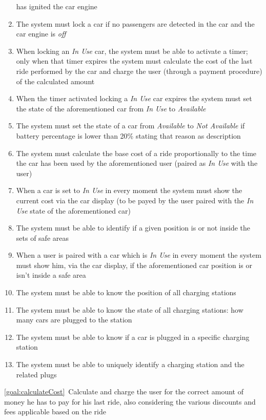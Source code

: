 \begin{description}
\begin{enumerate}[resume*]
  				has ignited the car engine
  				\item The system must lock a car if no passengers are detected in the car and the car
  				engine is \emph{off}
  				\item When locking  an \emph{In Use} car, the system must be able to activate a
  				timer; only when that timer expires the system must calculate the cost of the last ride
  				performed by the car and charge the user (through a payment procedure) of the
  				calculated amount
  				\item When the timer activated locking a \emph{In Use} car expires the system must
  				set the state of the aforementioned car from \emph{In Use} to \emph{Available}
  				\item The system must set the state of a car from \emph{Available}
  				to \emph{Not Available} if battery percentage is lower than 20\%  stating that reason
  				as description
  				\item The system must calculate the base cost of a ride proportionally to the time
  				the car has been used by the aforementioned user (paired as \emph{In Use} with the
  				user)
  				\item When a car is set to \emph{In Use} in every moment the system must show the
  				current cost via the car display (to be payed by the user paired with the \emph{In Use}
  				state of the aforementioned car) 
  				\item The system must be able to identify if a given position is or not inside the sets
  				of safe areas
  				\item When a user is paired with a car which is \emph{In Use} in every moment the
  				system must show him, via the car display, if the aforementioned car position is or
  				isn't inside a safe area
  				\item The system must be able to know the position of all charging stations
  				\item The system must be able to know the state of all charging stations: how many
  				cars are plugged to the station
  				\item The system must be able to know if a car is plugged in a specific charging
  				station
  				\item The system must be able to uniquely identify a charging station and the related
  				plugs
   			\end{enumerate}
  		\item \ref{goal:calculateCost}\ Calculate and charge the user for the correct amount of money he has to pay for his last ride, also considering the various discounts and fees applicable based on the ride

\end{description}

